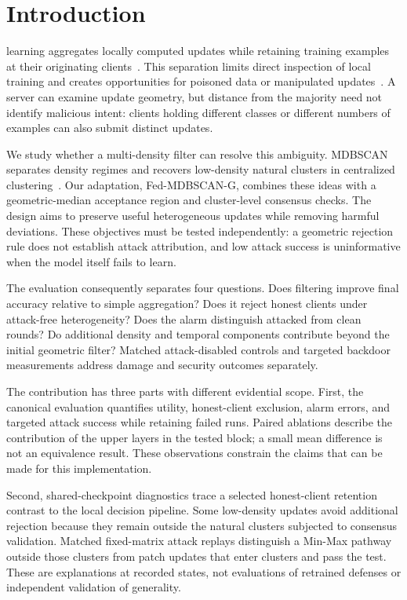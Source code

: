 \documentclass[journal]{IEEEtran}
\newcommand{\method}{Fed-MDBSCAN-G}
\begin{document}
\section{Introduction}
 learning aggregates locally computed updates while retaining training examples at their originating clients~\cite{mcmahan2017}. This separation limits direct inspection of local training and creates opportunities for poisoned data or manipulated updates~\cite{fang2020,bagdasaryan2020}. A server can examine update geometry, but distance from the majority need not identify malicious intent: clients holding different classes or different numbers of examples can also submit distinct updates.

We study whether a multi-density filter can resolve this ambiguity. MDBSCAN separates density regimes and recovers low-density natural clusters in centralized clustering~\cite{qian2024mdbscan}. Our adaptation, \method{}, combines these ideas with a geometric-median acceptance region and cluster-level consensus checks. The design aims to preserve useful heterogeneous updates while removing harmful deviations. These objectives must be tested independently: a geometric rejection rule does not establish attack attribution, and low attack success is uninformative when the model itself fails to learn.

The evaluation consequently separates four questions. Does filtering improve final accuracy relative to simple aggregation? Does it reject honest clients under attack-free heterogeneity? Does the alarm distinguish attacked from clean rounds? Do additional density and temporal components contribute beyond the initial geometric filter? Matched attack-disabled controls and targeted backdoor measurements address damage and security outcomes separately.

The contribution has three parts with different evidential scope. First, the canonical evaluation quantifies utility, honest-client exclusion, alarm errors, and targeted attack success while retaining failed runs. Paired ablations describe the contribution of the upper layers in the tested block; a small mean difference is not an equivalence result. These observations constrain the claims that can be made for this implementation.

Second, shared-checkpoint diagnostics trace a selected honest-client retention contrast to the local decision pipeline. Some low-density updates avoid additional rejection because they remain outside the natural clusters subjected to consensus validation. Matched fixed-matrix attack replays distinguish a Min-Max pathway outside those clusters from patch updates that enter clusters and pass the test. These are explanations at recorded states, not evaluations of retrained defenses or independent validation of generality.
\end{document}
